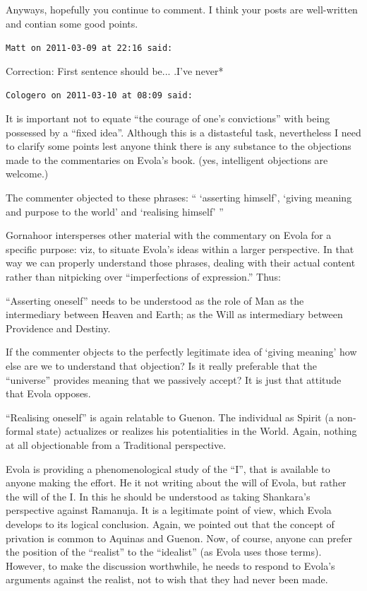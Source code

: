 \begin{footnotesize}
\begin{sffamily}
Anyways, hopefully you continue to comment. I think your posts are well-written and contian some good points.

\hfill

\texttt{Matt on 2011-03-09 at 22:16 said:}

Correction: First sentence should be... .I've never*

\hfill

\texttt{Cologero on 2011-03-10 at 08:09 said:}

It is important not to equate ``the courage of one's convictions'' with being possessed by a ``fixed idea''. Although this is a distasteful task, nevertheless I need to clarify some points lest anyone think there is any substance to the objections made to the commentaries on Evola's book. (yes, intelligent objections are welcome.)

The commenter objected to these phrases: `` `asserting himself', `giving meaning and purpose to the world' and `realising himself' ''

Gornahoor intersperses other material with the commentary on Evola for a specific purpose: viz, to situate Evola's ideas within a larger perspective. In that way we can properly understand those phrases, dealing with their actual content rather than nitpicking over ``imperfections of expression.'' Thus:

``Asserting oneself'' needs to be understood as the role of Man as the intermediary between Heaven and Earth; as the Will as intermediary between Providence and Destiny.

If the commenter objects to the perfectly legitimate idea of `giving meaning' how else are we to understand that objection? Is it really preferable that the ``universe'' provides meaning that we passively accept? It is just that attitude that Evola opposes.

``Realising oneself'' is again relatable to Guenon. The individual as Spirit (a non-formal state) actualizes or realizes his potentialities in the World. Again, nothing at all objectionable from a Traditional perspective.

Evola is providing a phenomenological study of the ``I'', that is available to anyone making the effort. He it not writing about the will of Evola, but rather the will of the I. In this he should be understood as taking Shankara's perspective against Ramanuja. It is a legitimate point of view, which Evola develops to its logical conclusion. Again, we pointed out that the concept of privation is common to Aquinas and Guenon. Now, of course, anyone can prefer the position of the ``realist'' to the ``idealist'' (as Evola uses those terms). However, to make the discussion worthwhile, he needs to respond to Evola's arguments against the realist, not to wish that they had never been made.


\end{sffamily}
\end{footnotesize}
